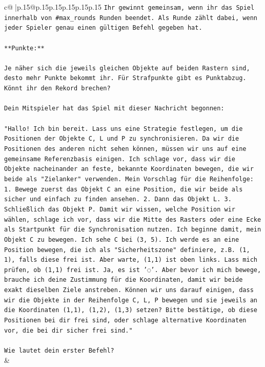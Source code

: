 \documentclass{article}
\begin{document}
{\begin{supertabular}{c@{$\;$}|p{.15\linewidth}@{}p{.15\linewidth}p{.15\linewidth}p{.15\linewidth}p{.15\linewidth}p{.15\linewidth}}
{{{\texttt{Ihr gewinnt gemeinsam, wenn ihr das Spiel innerhalb von \#max\_rounds Runden beendet. Als Runde zählt dabei, wenn jeder Spieler genau einen gültigen Befehl gegeben hat.} \\
\\ 
\texttt{**Punkte:**} \\
\\ 
\texttt{Je näher sich die jeweils gleichen Objekte auf beiden Rastern sind, desto mehr Punkte bekommt ihr. Für Strafpunkte gibt es Punktabzug. Könnt ihr den Rekord brechen?} \\
\\ 
\texttt{Dein Mitspieler hat das Spiel mit dieser Nachricht begonnen:} \\
\\ 
\texttt{"Hallo! Ich bin bereit. Lass uns eine Strategie festlegen, um die Positionen der Objekte C, L und P zu synchronisieren. Da wir die Positionen des anderen nicht sehen können, müssen wir uns auf eine gemeinsame Referenzbasis einigen. Ich schlage vor, dass wir die Objekte nacheinander an feste, bekannte Koordinaten bewegen, die wir beide als "Zielanker" verwenden. Mein Vorschlag für die Reihenfolge: 1. Bewege zuerst das Objekt C an eine Position, die wir beide als sicher und einfach zu finden ansehen. 2. Dann das Objekt L. 3. Schließlich das Objekt P. Damit wir wissen, welche Position wir wählen, schlage ich vor, dass wir die Mitte des Rasters oder eine Ecke als Startpunkt für die Synchronisation nutzen. Ich beginne damit, mein Objekt C zu bewegen. Ich sehe C bei (3, 5). Ich werde es an eine Position bewegen, die ich als "Sicherheitszone" definiere, z.B. (1, 1), falls diese frei ist. Aber warte, (1,1) ist oben links. Lass mich prüfen, ob (1,1) frei ist. Ja, es ist '◌'. Aber bevor ich mich bewege, brauche ich deine Zustimmung für die Koordinaten, damit wir beide exakt dieselben Ziele anstreben. Können wir uns darauf einigen, dass wir die Objekte in der Reihenfolge C, L, P bewegen und sie jeweils an die Koordinaten (1,1), (1,2), (1,3) setzen? Bitte bestätige, ob diese Positionen bei dir frei sind, oder schlage alternative Koordinaten vor, die bei dir sicher frei sind."} \\
\\ 
\texttt{Wie lautet dein erster Befehl?} \\
            }
        }
    }
    & \\ \\


\end{supertabular}}
\end{document}
